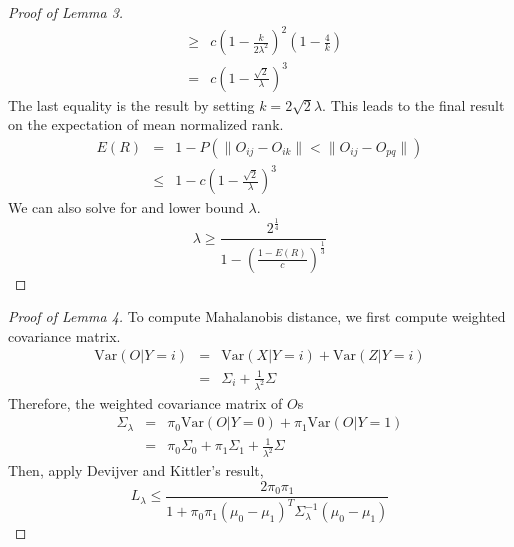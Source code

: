 \documentclass{article}
\begin{document}
\begin{proof}[Proof of Lemma 3]
\begin{eqnarray*}
&\geq& c(1-\frac{k}{2\lambda^2})^2(1-\frac{4}{k}) \\
&=&c(1-\frac{\sqrt{2}}{\lambda})^3
\end{eqnarray*}
The last equality is the result by setting $k=2\sqrt{2}\lambda$. This leads to the final result on the expectation of mean normalized rank.
\begin{eqnarray*}
E(R)&=&1-P(\|O_{ij}-O_{ik}\| < \|O_{ij}-O_{pq}\|) \\
&\leq& 1-c(1-\frac{\sqrt{2}}{\lambda})^3
\end{eqnarray*}
We can also solve for and lower bound $\lambda$.
\[\lambda \geq \frac{2^{\frac{1}{4}}}{1-(\frac{1-E(R)}{c})^{\frac{1}{3}}} \]
\end{proof}


\begin{proof}[Proof of Lemma 4]
To compute Mahalanobis distance, we first compute weighted covariance matrix.
\begin{eqnarray*}
\text{Var}(O|Y=i) &=& \text{Var}(X|Y=i)+\text{Var}(Z|Y=i) \\
&=& \Sigma_i+\frac{1}{\lambda^2}\Sigma
\end{eqnarray*}
Therefore, the weighted covariance matrix of $O$s
\begin{eqnarray*}
\Sigma_\lambda&=&\pi_0\text{Var}(O|Y=0)+\pi_1\text{Var}(O|Y=1) \\
&=&\pi_0\Sigma_0+\pi_1\Sigma_1+\frac{1}{\lambda^2}\Sigma
\end{eqnarray*}
Then, apply Devijver and Kittler's result,
\[L_\lambda \leq \frac{2\pi_0\pi_1}{1+\pi_0\pi_1(\mu_0-\mu_1)^T\Sigma_\lambda^{-1}(\mu_0-\mu_1)}\]
\end{proof}


\newpage
\small{


}
\end{document}
